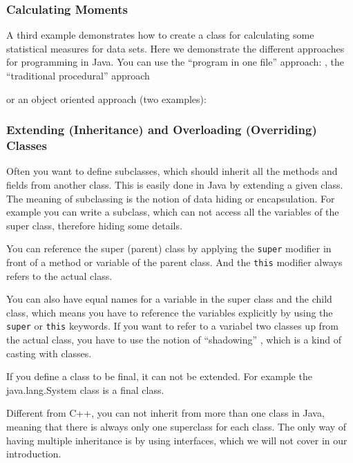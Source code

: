 \subsubsection{Calculating Moments}
A third example demonstrates how to create a class for calculating
some statistical measures for data sets. Here we demonstrate the
different approaches for programming in Java. You can use the
``program in one file'' approach: 
, the ``traditional procedural'' approach


or an object oriented approach (two examples): 




\subsubsection{Extending (Inheritance) and Overloading (Overriding) Classes}
Often you want to define subclasses, which should inherit all
the methods and fields from another class. This is easily done
in Java by extending a given class. The meaning of subclassing is the
notion of data hiding or encapsulation. For example you can write
a subclass, which can not access all the variables of the super class,
therefore hiding some details. 

You can reference the super (parent) class by applying the
\verb|super| modifier in front of a method or variable of
the parent class. And the \verb|this| modifier always refers to
the actual class. 

You can also have equal names for a variable in the super class and the
child class, which means you have to reference the variables explicitly
by using the \verb|super| or \verb|this| keywords. If you want to refer
to a variabel two classes up from the actual class, you have to use
the notion of ``shadowing'' \cite[]{javanutshell}, which is a kind of
casting with classes. 

If you define a class to be final, it can not be extended.
For example the java.lang.System class is a final class.

Different from C++,  you can not inherit from more than one class
in Java, meaning that there is always only one superclass for each
class. 
The only way of having multiple inheritance is by using
interfaces, which we will not cover in our introduction.

